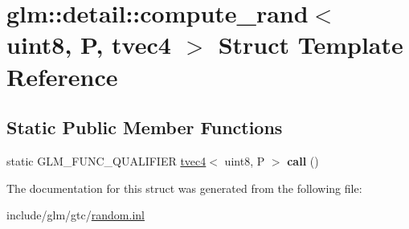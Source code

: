 \hypertarget{structglm_1_1detail_1_1compute__rand_3_01uint8_00_01P_00_01tvec4_01_4}{}\section{glm\+:\+:detail\+:\+:compute\+\_\+rand$<$ uint8, P, tvec4 $>$ Struct Template Reference}
\label{structglm_1_1detail_1_1compute__rand_3_01uint8_00_01P_00_01tvec4_01_4}
\subsection*{Static Public Member Functions}
\begin{DoxyCompactItemize}
\item 
\mbox{\label{structglm_1_1detail_1_1compute__rand_3_01uint8_00_01P_00_01tvec4_01_4_ad9fa915c8140a6fa885534d8c60e35fd}} 
static G\+L\+M\+\_\+\+F\+U\+N\+C\+\_\+\+Q\+U\+A\+L\+I\+F\+I\+ER \hyperlink{structglm_1_1tvec4}{tvec4}$<$ uint8, P $>$ {\bfseries call} ()
\end{DoxyCompactItemize}


The documentation for this struct was generated from the following file\+:\begin{DoxyCompactItemize}
\item 
include/glm/gtc/\hyperlink{random_8inl}{random.\+inl}\end{DoxyCompactItemize}
